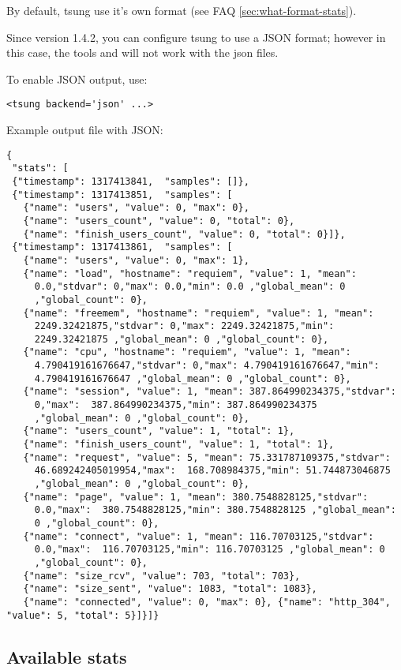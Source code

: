 \documentclass{TSUNG-en}
\begin{document}
By default, tsung use it's own format (see FAQ \ref{sec:what-format-stats}).

Since version 1.4.2, you can configure tsung to use a JSON format;
however in this case, the tools  and
 will not work with the json files.

To enable JSON output, use:
\begin{Verbatim}
<tsung backend='json' ...>
\end{Verbatim}

Example output file with JSON:
\begin{Verbatim}
{
 "stats": [
 {"timestamp": 1317413841,  "samples": []},
 {"timestamp": 1317413851,  "samples": [
   {"name": "users", "value": 0, "max": 0},
   {"name": "users_count", "value": 0, "total": 0},
   {"name": "finish_users_count", "value": 0, "total": 0}]},
 {"timestamp": 1317413861,  "samples": [
   {"name": "users", "value": 0, "max": 1},
   {"name": "load", "hostname": "requiem", "value": 1, "mean":
     0.0,"stdvar": 0,"max": 0.0,"min": 0.0 ,"global_mean": 0
     ,"global_count": 0},
   {"name": "freemem", "hostname": "requiem", "value": 1, "mean":
     2249.32421875,"stdvar": 0,"max": 2249.32421875,"min":
     2249.32421875 ,"global_mean": 0 ,"global_count": 0},
   {"name": "cpu", "hostname": "requiem", "value": 1, "mean":
     4.790419161676647,"stdvar": 0,"max": 4.790419161676647,"min":
     4.790419161676647 ,"global_mean": 0 ,"global_count": 0},
   {"name": "session", "value": 1, "mean": 387.864990234375,"stdvar":
     0,"max":  387.864990234375,"min": 387.864990234375
     ,"global_mean": 0 ,"global_count": 0},
   {"name": "users_count", "value": 1, "total": 1},
   {"name": "finish_users_count", "value": 1, "total": 1},
   {"name": "request", "value": 5, "mean": 75.331787109375,"stdvar":
     46.689242405019954,"max":  168.708984375,"min": 51.744873046875
     ,"global_mean": 0 ,"global_count": 0},
   {"name": "page", "value": 1, "mean": 380.7548828125,"stdvar":
     0.0,"max":  380.7548828125,"min": 380.7548828125 ,"global_mean":
     0 ,"global_count": 0},
   {"name": "connect", "value": 1, "mean": 116.70703125,"stdvar":
     0.0,"max":  116.70703125,"min": 116.70703125 ,"global_mean": 0
     ,"global_count": 0},
   {"name": "size_rcv", "value": 703, "total": 703},
   {"name": "size_sent", "value": 1083, "total": 1083},
   {"name": "connected", "value": 0, "max": 0}, {"name": "http_304", "value": 5, "total": 5}]}]}
\end{Verbatim}

\subsection{Available stats}
\end{document}
